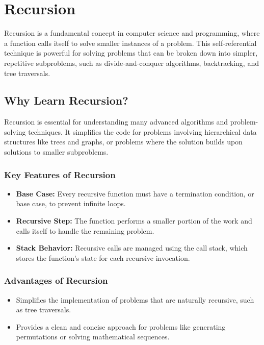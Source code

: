 
\chapter{Recursion}
\label{chap:Recursion}

Recursion is a fundamental concept in computer science and programming, where a function calls itself to solve smaller instances of a problem. This self-referential technique is powerful for solving problems that can be broken down into simpler, repetitive subproblems, such as divide-and-conquer algorithms, backtracking, and tree traversals.

\section*{Why Learn Recursion?}
Recursion is essential for understanding many advanced algorithms and problem-solving techniques. It simplifies the code for problems involving hierarchical data structures like trees and graphs, or problems where the solution builds upon solutions to smaller subproblems.

\subsection*{Key Features of Recursion}
\begin{itemize}
    \item \textbf{Base Case:} Every recursive function must have a termination condition, or base case, to prevent infinite loops.
    \item \textbf{Recursive Step:} The function performs a smaller portion of the work and calls itself to handle the remaining problem.
    \item \textbf{Stack Behavior:} Recursive calls are managed using the call stack, which stores the function's state for each recursive invocation.
\end{itemize}

\subsection*{Advantages of Recursion}
\begin{itemize}
    \item Simplifies the implementation of problems that are naturally recursive, such as tree traversals.
    \item Provides a clean and concise approach for problems like generating permutations or solving mathematical sequences.
\end{itemize}

